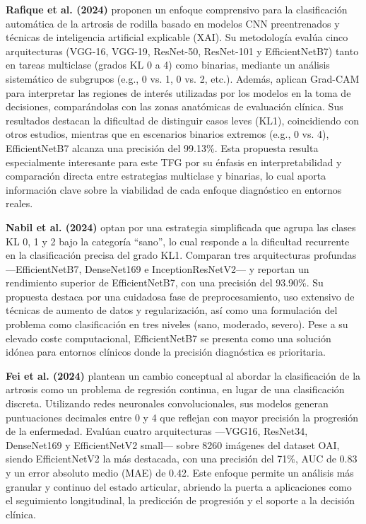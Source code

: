 \documentclass[11pt,spanish,listoffigures,listoftables]{tfgetsinf}
\begin{document}
\textbf{Rafique et al. (2024)} \cite{rafique2024knee} proponen un enfoque comprensivo para la clasificación automática de la artrosis 
de rodilla basado en modelos CNN preentrenados y técnicas de inteligencia artificial explicable (XAI). Su metodología evalúa cinco 
arquitecturas (VGG-16, VGG-19, ResNet-50, ResNet-101 y EfficientNetB7) tanto en tareas multiclase (grados KL 0 a 4) como binarias, 
mediante un análisis sistemático de subgrupos (e.g., 0 vs. 1, 0 vs. 2, etc.). Además, aplican Grad-CAM para interpretar las regiones 
de interés utilizadas por los modelos en la toma de decisiones, comparándolas con las zonas anatómicas de evaluación clínica. Sus 
resultados destacan la dificultad de distinguir casos leves (KL1), coincidiendo con otros estudios, mientras que en escenarios binarios 
extremos (e.g., 0 vs. 4), EfficientNetB7 alcanza una precisión del 99.13\%. Esta propuesta resulta especialmente interesante para 
este TFG por su énfasis en interpretabilidad y comparación directa entre estrategias multiclase y binarias, lo cual aporta 
información clave sobre la viabilidad de cada enfoque diagnóstico en entornos reales.

\textbf{Nabil et al. (2024)} \cite{nabil2024automatic} optan por una estrategia simplificada que agrupa las clases KL 0, 1 y 2 bajo la categoría 
“sano”, lo cual responde a la dificultad recurrente en la clasificación precisa del grado KL1. Comparan tres arquitecturas profundas 
—EfficientNetB7, DenseNet169 e InceptionResNetV2— y reportan un rendimiento superior de EfficientNetB7, con una precisión del 93.90\%. 
Su propuesta destaca por una cuidadosa fase de preprocesamiento, uso extensivo de técnicas de aumento de datos y regularización, así 
como una formulación del problema como clasificación en tres niveles (sano, moderado, severo). Pese a su elevado coste computacional, 
EfficientNetB7 se presenta como una solución idónea para entornos clínicos donde la precisión diagnóstica es prioritaria.

\textbf{Fei et al. (2024)} \cite{fei2024diagnosing} plantean un cambio conceptual al abordar la clasificación de la artrosis como un problema 
de regresión continua, en lugar de una clasificación discreta. Utilizando redes neuronales convolucionales, sus modelos generan puntuaciones 
decimales entre 0 y 4 que reflejan con mayor precisión la progresión de la enfermedad. Evalúan cuatro arquitecturas —VGG16, ResNet34, 
DenseNet169 y EfficientNetV2 small— sobre 8260 imágenes del dataset OAI, siendo EfficientNetV2 la más destacada, con una precisión del 71\%, 
AUC de 0.83 y un error absoluto medio (MAE) de 0.42. Este enfoque permite un análisis más granular y continuo del estado articular, abriendo 
la puerta a aplicaciones como el seguimiento longitudinal, la predicción de progresión y el soporte a la decisión clínica.
\end{document}
